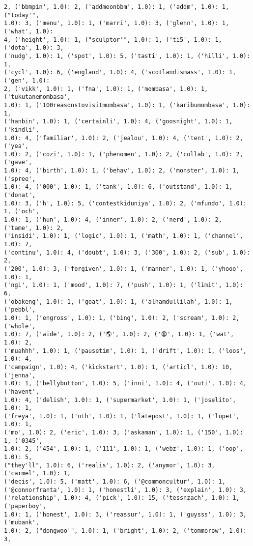\documentclass[11pt]{article}
\begin{document}
\begin{Verbatim}[commandchars=\\\{\}]
2, ('bbmpin', 1.0): 2, ('addmeonbbm', 1.0): 1, ('addm', 1.0): 1, ("today'",
1.0): 3, ('menu', 1.0): 1, ('marri', 1.0): 3, ('glenn', 1.0): 1, ('what', 1.0):
4, ('height', 1.0): 1, ("sculptor'", 1.0): 1, ('ti5', 1.0): 1, ('dota', 1.0): 3,
('nudg', 1.0): 1, ('spot', 1.0): 5, ('tasti', 1.0): 1, ('hilli', 1.0): 1,
('cycl', 1.0): 6, ('england', 1.0): 4, ('scotlandismass', 1.0): 1, ('gen', 1.0):
2, ('vikk', 1.0): 1, ('fna', 1.0): 1, ('mombasa', 1.0): 1, ('tukutanemombasa',
1.0): 1, ('100reasonstovisitmombasa', 1.0): 1, ('karibumombasa', 1.0): 1,
('hanbin', 1.0): 1, ('certainli', 1.0): 4, ('goosnight', 1.0): 1, ('kindli',
1.0): 4, ('familiar', 1.0): 2, ('jealou', 1.0): 4, ('tent', 1.0): 2, ('yea',
1.0): 2, ('cozi', 1.0): 1, ('phenomen', 1.0): 2, ('collab', 1.0): 2, ('gave',
1.0): 4, ('birth', 1.0): 1, ('behav', 1.0): 2, ('monster', 1.0): 1, ('spree',
1.0): 4, ('000', 1.0): 1, ('tank', 1.0): 6, ('outstand', 1.0): 1, ('donat',
1.0): 3, ('h', 1.0): 5, ('contestkiduniya', 1.0): 2, ('mfundo', 1.0): 1, ('och',
1.0): 1, ('hun', 1.0): 4, ('inner', 1.0): 2, ('nerd', 1.0): 2, ('tame', 1.0): 2,
('insidi', 1.0): 1, ('logic', 1.0): 1, ('math', 1.0): 1, ('channel', 1.0): 7,
('continu', 1.0): 4, ('doubt', 1.0): 3, ('300', 1.0): 2, ('sub', 1.0): 2,
('200', 1.0): 3, ('forgiven', 1.0): 1, ('manner', 1.0): 1, ('yhooo', 1.0): 1,
('ngi', 1.0): 1, ('mood', 1.0): 7, ('push', 1.0): 1, ('limit', 1.0): 6,
('obakeng', 1.0): 1, ('goat', 1.0): 1, ('alhamdullilah', 1.0): 1, ('pebbl',
1.0): 1, ('engross', 1.0): 1, ('bing', 1.0): 2, ('scream', 1.0): 2, ('whole',
1.0): 7, ('wide', 1.0): 2, ('🌎', 1.0): 2, ('😧', 1.0): 1, ('wat', 1.0): 2,
('muahhh', 1.0): 1, ('pausetim', 1.0): 1, ('drift', 1.0): 1, ('loos', 1.0): 4,
('campaign', 1.0): 4, ('kickstart', 1.0): 1, ('articl', 1.0): 10, ('jenna',
1.0): 1, ('bellybutton', 1.0): 5, ('inni', 1.0): 4, ('outi', 1.0): 4, ('havent',
1.0): 4, ('delish', 1.0): 1, ('supermarket', 1.0): 1, ('joselito', 1.0): 1,
('freya', 1.0): 1, ('nth', 1.0): 1, ('latepost', 1.0): 1, ('lupet', 1.0): 1,
('mo', 1.0): 2, ('eric', 1.0): 3, ('askaman', 1.0): 1, ('150', 1.0): 1, ('0345',
1.0): 2, ('454', 1.0): 1, ('111', 1.0): 1, ('webz', 1.0): 1, ('oop', 1.0): 5,
("they'll", 1.0): 6, ('realis', 1.0): 2, ('anymor', 1.0): 3, ('carmel', 1.0): 1,
('decis', 1.0): 5, ('matt', 1.0): 6, ('@commoncultur', 1.0): 1,
('@connorfranta', 1.0): 1, ('honestli', 1.0): 3, ('explain', 1.0): 3,
('relationship', 1.0): 4, ('pick', 1.0): 15, ('tessnzach', 1.0): 1, ('paperboy',
1.0): 1, ('honest', 1.0): 3, ('reassur', 1.0): 1, ('guysss', 1.0): 3, ('mubank',
1.0): 2, ("dongwoo'", 1.0): 1, ('bright', 1.0): 2, ('tommorow', 1.0): 3,

\end{Verbatim}
\end{document}
